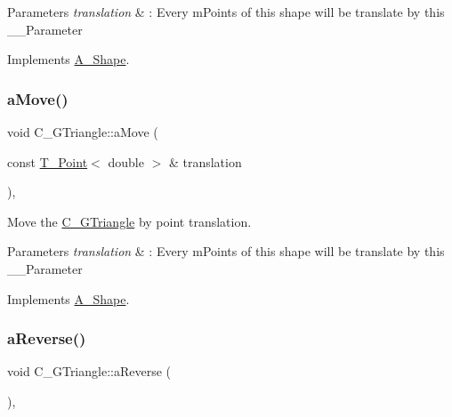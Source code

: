 \begin{DoxyParams}{Parameters}
{\em translation} & \+: Every m\+Points of this shape will be translate by this \+\_\+\+\_\+\+Parameter \\
\hline
\end{DoxyParams}


Implements \hyperlink{classA__Shape_ab284298db1b557ccfa7ba6de7a5fee2c}{A\+\_\+\+Shape}.

\mbox{\label{classC__GTriangle_a07789441ce75f81fd4c4649a0115edbe}} 
\subsubsection{\texorpdfstring{a\+Move()}{aMove()}\hspace{0.1cm}{\footnotesize\ttfamily [2/2]}}
{\footnotesize\ttfamily void C\+\_\+\+G\+Triangle\+::a\+Move (\begin{DoxyParamCaption}\item[{const \hyperlink{classT__Point}{T\+\_\+\+Point}$<$ double $>$ \&}]{translation }\end{DoxyParamCaption})\hspace{0.3cm}{\ttfamily [override]}, {\ttfamily [virtual]}}



Move the \hyperlink{classC__GTriangle}{C\+\_\+\+G\+Triangle} by point translation. 


\begin{DoxyParams}{Parameters}
{\em translation} & \+: Every m\+Points of this shape will be translate by this \+\_\+\+\_\+\+Parameter \\
\hline
\end{DoxyParams}


Implements \hyperlink{classA__Shape_ab284298db1b557ccfa7ba6de7a5fee2c}{A\+\_\+\+Shape}.

\mbox{\label{classC__GTriangle_a479646fa1265aaf2299b59787c394a27}} 
\subsubsection{\texorpdfstring{a\+Reverse()}{aReverse()}\hspace{0.1cm}{\footnotesize\ttfamily [1/2]}}
{\footnotesize\ttfamily void C\+\_\+\+G\+Triangle\+::a\+Reverse (\begin{DoxyParamCaption}{ }\end{DoxyParamCaption})\hspace{0.3cm}{\ttfamily [override]}, {\ttfamily [virtual]}}



